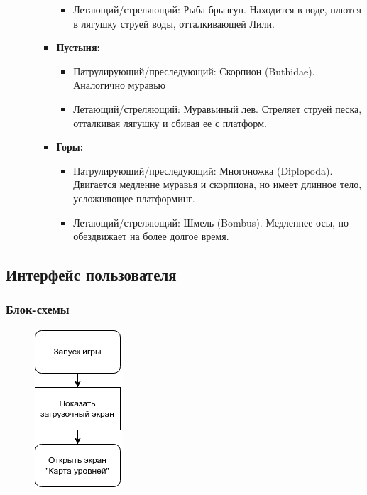 \documentclass{article}
\begin{document}
\begin{enumerate}
\begin{itemize}
\begin{itemize}
\begin{itemize}
                \item Летающий/стреляющий: Рыба брызгун. Находится в воде, плются в лягушку струей воды, отталкивающей Лили.
            \end {itemize}
            \item \textbf{Пустыня:}
            \begin{itemize}
                \item Патрулирующий/преследующий: Скорпион (Buthidae). Аналогично муравью
                \item Летающий/стреляющий: Муравьиный лев. Стреляет струей песка, отталкивая лягушку и сбивая ее с платформ.
            \end {itemize}
            \item \textbf{Горы:}
            \begin{itemize}
                \item Патрулирующий/преследующий: Многоножка (Diplopoda). Двигается медленне муравья и скорпиона, но имеет длинное тело, усложняющее платформинг.
                \item Летающий/стреляющий: Шмель (Bombus). Медленнее осы, но обездвижает на более долгое время.
            \end {itemize}
        \end {itemize}
        \end{itemize}
\end{enumerate}

\subsection{Интерфейс пользователя}

\subsubsection{Блок-схемы}

\begin{figure}[H]
    \includegraphics[scale=1]{pictures/1.png}
\end{figure}
\end{document}
